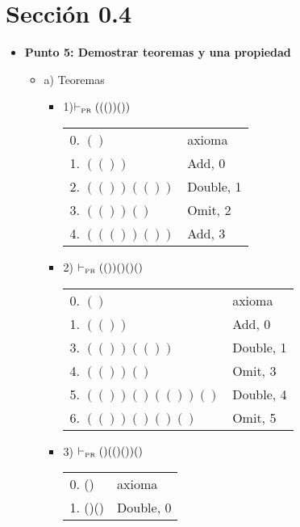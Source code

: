 \documentclass{article}
\begin{document}
\section{Sección 0.4}
\begin{itemize}
	\item[] \textbf{Punto 5: Demostrar teoremas y una propiedad}
		\begin{itemize}
			\item a) Teoremas
			      \begin{itemize}
				      \item 1)$\vdash_{\textrm{\tiny{PR}}}((())())$
				            \begin{center}
					            \begin{NiceTabular}{l l}
						            0. $()$       & axioma    \\
						            1. $(())$     & Add, 0    \\
						            2. $(())(())$ & Double, 1 \\
						            3. $(())()$   & Omit, 2   \\
						            4. $((())())$ & Add, 3
					            \end{NiceTabular}
				            \end{center}
				      \item 2) $\vdash_{\textrm{\tiny{PR}}} (())()()()$
				            \begin{center}
					            \begin{NiceTabular}{l l}
						            0. $()$           & axioma    \\
						            1. $(())$         & Add, 0    \\
						            3. $(())(())$     & Double, 1 \\
						            4. $(())()$       & Omit, 3   \\
						            5. $(())()(())()$ & Double, 4 \\
						            6. $(())()()()$   & Omit, 5
					            \end{NiceTabular}
				            \end{center}
				      \item 3) $\vdash_{\textrm{\tiny{PR}}} ()(()())()$
				            \begin{center}
					            \begin{NiceTabular}{l l}
						            0. ()               & axioma    \\
						            1. ()()             & Double, 0 \\

\end{NiceTabular}
\end{center}
\end{itemize}
\end{itemize}
\end{itemize}
\end{document}
